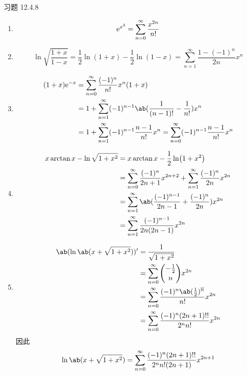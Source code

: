 \begin{problem}
    习题 12.4.8
    \begin{solution}
        \begin{enumerate}
            \item[\textbf{1)}]
            $$
            \mathrm{e}^{x^2} = \sum_{n = 0}^{\infty} \frac{x^{2n}}{n!}
            $$
            \item[\textbf{3)}]
            $$
            \ln \sqrt{\frac{1 + x}{1 - x}} = \frac{1}{2} \ln (1 + x) - \frac{1}{2} \ln (1 - x) = \sum_{n = 1}^{\infty} \frac{1 - (-1)^{n}}{2 n} x^{n}
            $$
            \item[\textbf{5)}]
            $$
            \begin{aligned}
                (1 + x) \E^{-x} & = \sum_{n = 0}^{\infty} \frac{(-1)^{n}}{n!} x^{n} (1 + x) \\
                & = 1 + \sum_{n = 1}^{\infty} (-1)^{n - 1} \ab(\frac{1}{(n - 1)!} - \frac{1}{n!}) x^{n} \\
                & = 1 + \sum_{n = 1}^{\infty} (-1)^{n - 1} \frac{n - 1}{n!} x^{n} = \sum_{n = 0}^{\infty} (-1)^{n - 1} \frac{n - 1}{n!} x^{n}
            \end{aligned}
            $$
            \item[\textbf{7)}]
            $$
            \begin{aligned}
                x \arctan x - \ln \sqrt{1 + x^2} & = x \arctan x - \frac{1}{2} \ln (1 + x^2) \\
                & = \sum_{n = 0}^{\infty} \frac{(-1)^{n}}{2n + 1} x^{2n + 2} + \sum_{n = 1}^{\infty} \frac{(-1)^{n}}{2n} x^{2n} \\
                & = \sum_{n = 1}^{\infty} \ab(\frac{(-1)^{n - 1}}{2n - 1} + \frac{(-1)^{n}}{2n}) x^{2n} \\
                & = \sum_{n = 1}^{\infty} \frac{(-1)^{n - 1}}{2n (2n - 1)} x^{2n}
            \end{aligned}
            $$
            \item[\textbf{9)}]
            $$
            \begin{aligned}
                \ab(\ln \ab(x + \sqrt{1 + x^2}))' & = \frac{1}{\sqrt{1 + x^2}} \\
                & = \sum_{n = 0}^{\infty} \binom{-\frac{1}{2}}{n} x^{2n} \\
                & = \sum_{n = 0}^{\infty} \frac{(-1)^{n} \ab(\frac{1}{2})^{\overline{n}}}{n!} x^{2n} \\
                & = \sum_{n = 0}^{\infty} \frac{(-1)^{n} (2n + 1)!!}{2^{n} n!} x^{2n}
            \end{aligned}
            $$
            因此
            $$
            \ln \ab(x + \sqrt{1 + x^2}) = \sum_{n = 0}^{\infty} \frac{(-1)^{n} (2n + 1)!!}{2^{n} n! (2n + 1)} x^{2n + 1}
            $$
        \end{enumerate}
    \end{solution}
\end{problem}

